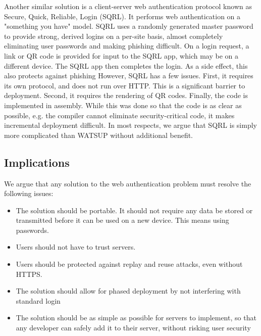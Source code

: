 Another similar solution is a client-server web authentication protocol known as Secure, Quick, Reliable, Login (SQRL). It performs web authentication on a "something you have" model. SQRL uses a randomly generated master password to provide strong, derived logins on a per-site basis, almost completely eliminating user passwords and making phishing difficult. On a login request, a link or QR code is provided for input to the SQRL app, which may be on a different device. The SQRL app then completes the login. As a side effect, this also protects against phishing \cite{SQRL:2016} However, SQRL has a few issues. First, it requires its own protocol, and does not run over HTTP. This is a significant barrier to deployment. Second, it requires the rendering of QR codes. Finally, the code is implemented in assembly. While this was done so that the code is as clear as possible, e.g. the compiler cannot eliminate security-critical code, it makes incremental deployment difficult. In most respects, we argue that SQRL is simply more complicated than WATSUP without additional benefit.

\subsection{Implications}
We argue that any solution to the web authentication problem must resolve the following issues:

\begin{itemize}

    \item The solution should be portable. It should not require any data be stored or transmitted before it can be used on a new device. This means using passwords.

    \item Users should not have to trust servers.

    \item Users should be protected against replay and reuse attacks, even without HTTPS.

    \item The solution should allow for phased deployment by not interfering with standard login

    \item The solution should be as simple as possible for servers to implement, so that any developer can safely add it to their server, without risking user security

\end{itemize}
